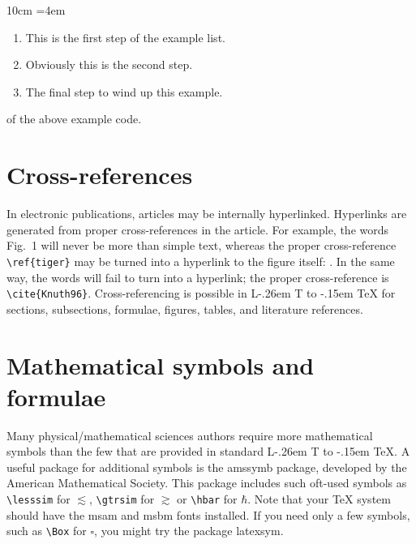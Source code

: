 \documentclass[a4paper,12pt]{article}
\makeatletter
\def\file#1{\textsf{#1}\xspace}
\DeclareRobustCommand{\LaTeX}{L\kern-.26em%
        {\sbox\z@ T%
         \vbox to\ht\z@{\hbox{\check@mathfonts
           \fontsize\sf@size\z@
           \math@fontsfalse\selectfont
          A\,}%
         \vss}%
        }%
     \kern-.15em%
    \TeX}
\makeatother
\begin{document}
\begin{toolwrite}{10cm}
\lmrgn=4em
 \begin{enumerate}[Step 1.]
  \item This is the first step of the example list.
\item Obviously this is the second step.
\item The final step to wind up this example.
 \end{enumerate}
\end{toolwrite}

 of the above example code.

\section{Cross-references}
\hypertarget{crossreferences}{}

In electronic publications, articles may be internally
hyperlinked. Hyperlinks are generated from proper
cross-references in the article.  For example, the words
\textcolor{black!80}{Fig.~1} will never be more than simple text,
whereas the proper cross-reference \verb+\ref{tiger}+ may be
turned into a hyperlink to the figure itself:
.  In the same way,
the words  will fail to turn into a
hyperlink; the proper cross-reference is \verb+\cite{Knuth96}+.
Cross-referencing is possible in \LaTeX{} for sections,
subsections, formulae, figures, tables, and literature
references.

\section{Mathematical symbols and formulae}
\hypertarget{math}{}

Many physical/mathematical sciences authors require more
mathematical symbols than the few that are provided in standard
\LaTeX. A useful package for additional symbols is the
\file{amssymb} package, developed by the American Mathematical
Society. This package includes such oft-used symbols as
\verb+\lesssim+ for $\lesssim$, \verb+\gtrsim+ for $\gtrsim$ or
\verb+\hbar+ for $\hbar$. Note that your \TeX{} system should
have the \file{msam} and \file{msbm} fonts installed. If you need
only a few symbols, such as \verb+\Box+ for $\square$, you might
try the package \file{latexsym}.
\end{document}
